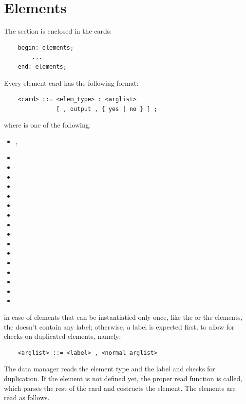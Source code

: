 \chapter{Elements}
The  section is enclosed in the cards:
\begin{verbatim}
    begin: elements;
        ...
    end: elements;
\end{verbatim}
Every element card has the following format:
\begin{verbatim}
    <card> ::= <elem_type> : <arglist>
               [ , output , { yes | no } ] ;
\end{verbatim}
where  is one of the following:
\begin{itemize}
  \item {}, 
  \item {}
  \item {}
  \item {}
  \item {}
  \item {}
  \item {}
  \item {}
  \item {}
  \item {}
  \item {}
  \item {}
  \item {}
  \item {}
  \item {}
  \item {}
  \item {}
\end{itemize}
in case of elements that can be instantiatied only once, like
the  or the  elements, the 
doesn't contain any label; otherwise, a label is expected first, to allow 
for checks on duplicated elements, namely: 
\begin{verbatim}
    <arglist> ::= <label> , <normal_arglist>
\end{verbatim}
The data manager reads the element type and the label and checks for
duplication. If the element is not defined yet, the proper read function is
called, which parses the rest of the card and costructs the element.
The elements are read as follows.



